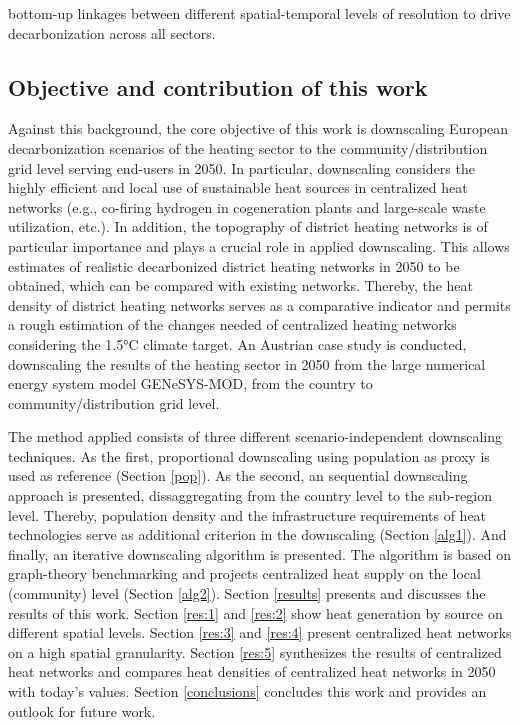 bottom-up linkages between different spatial-temporal levels of resolution to drive decarbonization across all sectors.\vspace{0.3cm}

\subsection{Objective and contribution of this work}
Against this background, the core objective of this work is downscaling European decarbonization scenarios of the heating sector to the community/distribution grid level serving end-users in 2050. In particular, downscaling considers the highly efficient and local use of sustainable heat sources in centralized heat networks (e.g., co-firing hydrogen in cogeneration plants and large-scale waste utilization, etc.). In addition, the topography of district heating networks is of particular importance and plays a crucial role in applied downscaling. This allows estimates of realistic decarbonized district heating networks in 2050 to be obtained, which can be compared with existing networks. Thereby, the heat density of district heating networks serves as a comparative indicator and permits a rough estimation of the changes needed of centralized heating networks considering the 1.5°C climate target. An Austrian case study is conducted, downscaling the results of the heating sector in 2050 from the large numerical energy system model GENeSYS-MOD, from the country to community/distribution grid level.\vspace{0.3cm}

The method applied consists of three different scenario-independent downscaling techniques. As the first, proportional downscaling using population as proxy is used as reference (Section \ref{pop}). As the second, an sequential downscaling approach is presented, dissaggregating from the country level to the sub-region level. Thereby, population density and the infrastructure requirements of heat technologies serve as additional criterion in the downscaling (Section \ref{alg1}). And finally, an iterative downscaling algorithm is presented. The algorithm is based on graph-theory benchmarking and projects centralized heat supply on the local (community) level (Section \ref{alg2}). Section \ref{results} presents and discusses the results of this work. Section \ref{res:1} and \ref{res:2} show heat generation by source on different spatial levels. Section \ref{res:3} and \ref{res:4} present centralized heat networks on a high spatial granularity. Section \ref{res:5} synthesizes the results of centralized heat networks and compares heat densities of centralized heat networks in 2050 with today's values. Section \ref{conclusions} concludes this work and provides an outlook for future work. 
